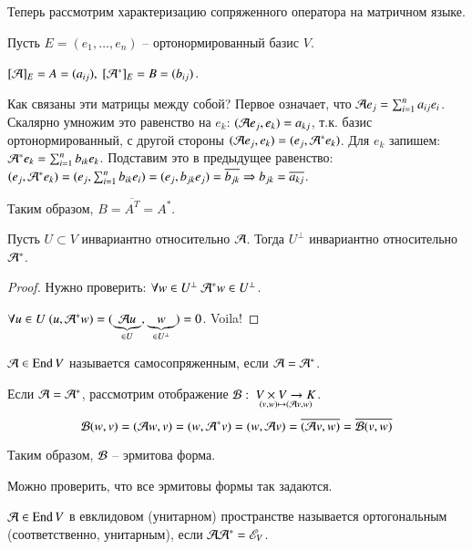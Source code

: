 \documentclass[main]{subfiles}
\begin{document}
Теперь рассмотрим характеризацию сопряженного оператора на матричном языке.

Пусть $E = (e_1, \ldots, e_n)$ -- ортонормированный базис $V$.

$[\mathcal{A}]_E = A = (a_{ij}), \ [\mathcal{A}^*]_E = B = (b_{ij})$.

Как связаны эти матрицы между собой?
Первое означает, что $\mathcal{A} e_j = \sum_{i=1}^n a_{ij} e_i$. Скалярно умножим это равенство на $e_k$:
$(\mathcal{A} e_j, e_k) = a_{kj}$, т.к. базис ортонормированный, с другой стороны $(\mathcal{A} e_j, e_k) = (e_j, \mathcal{A}^* e_k)$.
Для $e_k$ запишем: $\mathcal{A}^* e_k = \sum_{i=1}^n b_{i k} e_k$. Подставим это в предыдущее равенство:
$(e_j, \mathcal{A}^* e_k) = (e_j, \sum_{i=1}^n b_{i k} e_i) = (e_j, b_{j k} e_j) = \overline{b_{j k}} \Rightarrow
    b_{j k} = \overline{a_{k j}}$.

Таким образом, $B = \overline{A^T} = A^*$.

\begin{proposition}
    Пусть $U \subset V$ инвариантно относительно $\mathcal{A}$. Тогда $U^{\perp}$ инвариантно относительно $\mathcal{A}^*$.
\end{proposition}

\begin{proof}
    Нужно проверить: $\forall w \in U^{\perp} \ \mathcal{A}^* w \in U^{\perp}$.

    $\forall u \in U \ (u, \mathcal{A}^* w) = (\underbrace{\mathcal{A} u}_{\in U}, \underbrace{w}_{\in U^{\perp}}) = 0$. Voila!
\end{proof}

\begin{definition} 
    $\mathcal{A} \in \operatorname{End} V$ называется самосопряженным, если $\mathcal{A} = \mathcal{A}^*$.
\end{definition}

Если  $\mathcal{A} = \mathcal{A}^*$, рассмотрим отображение $\mathcal{B}: \ \underset{(v, w) \mapsto (\mathcal{A} v, w)}{V\times V \rightarrow K}$.
\[\mathcal{B}(w, v) = (\mathcal{A} w, v) = (w, \mathcal{A}^* v) = (w, \mathcal{A} v) = \overline{(\mathcal{A} v, w)} = \overline{\mathcal{B}( v, w)}\]

Таким образом, $\mathcal{B}$ -- эрмитова форма.

Можно проверить, что все эрмитовы формы так задаются.

\begin{definition} 
    $\mathcal{A} \in \operatorname{End} V$ в евклидовом (унитарном) пространстве называется ортогональным (соответственно, унитарным),
    если $\mathcal{A} \mathcal{A}^* = \mathscr{E}_V$.
\end{definition}
\end{document}
